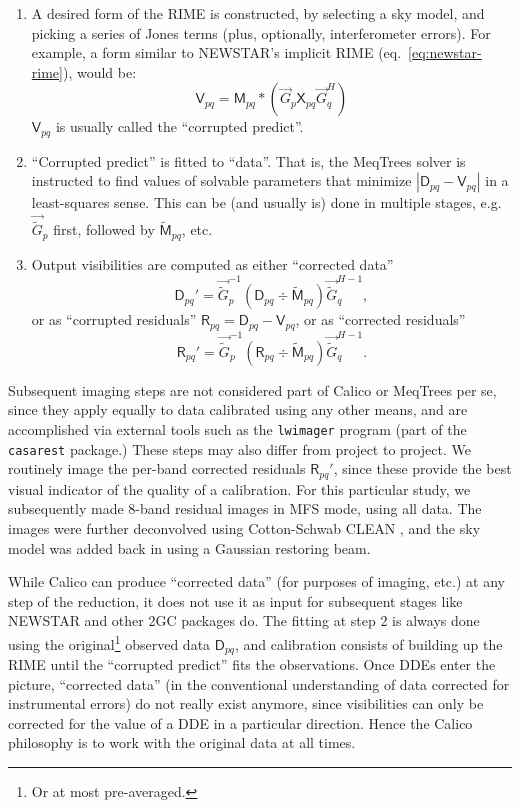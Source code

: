 \documentclass[]{aa}
\newcommand{\herm}{H}
\newcommand{\jones}[2]{\vec {#1}_{#2}}
\newcommand{\jonesinv}[2]{\vec {#1}^{-1}_{#2}}
\newcommand{\jonesT}[2]{\vec {#1}^{\herm}_{#2}}
\newcommand{\jonesTinv}[2]{\vec {#1}^{{\herm}-1}_{#2}}
\newcommand{\coh}[2]{\mathsf{{#1}}_{{#2}}}
\begin{document}
\begin{enumerate}
\item A desired form of the RIME is constructed, by selecting a sky model, and picking a series of Jones terms (plus, optionally, interferometer errors). For example, a form similar to NEWSTAR's implicit RIME (eq.~\ref{eq:newstar-rime}), would be:
\[
\coh{V}{pq} =  \coh{M}{pq} \ast ( \jones{G}{p} \coh{X}{pq} \jonesT{G}{q} ) 
\]
$\coh{V}{pq}$ is usually called the ``corrupted predict''.
\item ``Corrupted predict'' is fitted to ``data''. That is, the MeqTrees solver is instructed to find values of solvable parameters that minimize $|\coh{D}{pq}-\coh{V}{pq}|$ in a least-squares sense. This can be (and usually is) done in multiple stages, e.g. $\jones{\tilde{G}}{p}$ first, followed by $\coh{\tilde{M}}{pq}$, etc.
\item Output visibilities are computed as either ``corrected data''
\[
\coh{D}{pq}' = \jonesinv{\tilde{G}}{p} (\coh{D}{pq} \div \coh{\tilde{M}}{pq}) \jonesTinv{\tilde{G}}{q},
\]
or as ``corrupted residuals'' $\coh{R}{pq} = \coh{D}{pq}-\coh{V}{pq}$, or as ``corrected residuals''
\[
\coh{R}{pq}' = \jonesinv{\tilde{G}}{p} (\coh{R}{pq} \div \coh{\tilde{M}}{pq}) \jonesTinv{\tilde{G}}{q}.
\]
\end{enumerate}

Subsequent imaging steps are not considered part of Calico or MeqTrees per se, since they apply equally to data calibrated using any other means, and are accomplished via external tools such as the {\tt lwimager} program (part of the {\tt casarest} package.) These steps may also differ from project to project. We routinely image the per-band corrected residuals $\coh{R}{pq}'$, since these provide the best visual indicator of the quality of a calibration. For this particular study, we subsequently made 8-band residual images in MFS mode, using all data. The images were further deconvolved using Cotton-Schwab CLEAN \citep{Schwab:csclean}, and the sky model was added back in using a Gaussian restoring beam.

While Calico can produce ``corrected data'' (for purposes of imaging, etc.) at any step of the reduction, it does not use it as input for subsequent stages like NEWSTAR and other 2GC packages do. The fitting at step 2 is always done using the original\footnote{Or at most pre-averaged.} observed data $\coh{D}{pq}$, and calibration consists of building up the RIME until the ``corrupted predict'' fits the observations. Once DDEs enter the picture, ``corrected data'' (in the conventional understanding of data corrected for instrumental errors) do not really exist anymore, since visibilities can only be corrected for the value of a DDE in a particular direction. Hence the Calico philosophy is to work with the original data at all times.
\end{document}
